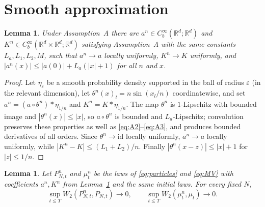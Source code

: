 \documentclass[11pt]{amsart}
\numberwithin{equation}{section}
\theoremstyle{plain}
\newtheorem{lemma}[theorem]{Lemma}
\theoremstyle{remark}
\newcommand{\R}{\mathbb{R}}
\newcommand{\W}{W_2}
\begin{document}
\section{Smooth approximation}\label{sec:approx}

\begin{lemma}\label{lem:mollify}
Under Assumption~A there are $a^n\in C^\infty_b(\R^d;\R^d)$ and $K^n\in C^\infty_b(\R^d\times\R^d;\R^d)$ satisfying Assumption~A with the same constants $L_a,L_1,L_2,M$, such that $a^n\to a$ locally uniformly, $K^n\to K$ uniformly, and $|a^n(x)|\le|a(0)|+L_a(|x|+1)$ for all $n$ and $x$.
\end{lemma}

\begin{proof}
Let $\eta_\varepsilon$ be a smooth probability density supported in the ball of radius $\varepsilon$ (in the relevant dimension), let $\theta^n(x)_l=n\sin(x_l/n)$ coordinatewise, and set $a^n=(a\circ\theta^n)*\eta_{1/n}$ and $K^n=K*\eta_{1/n}$. The map $\theta^n$ is $1$-Lipschitz with bounded image and $|\theta^n(x)|\le|x|$, so $a\circ\theta^n$ is bounded and $L_a$-Lipschitz; convolution preserves these properties as well as \eqref{eq:A2}--\eqref{eq:A3}, and produces bounded derivatives of all orders. Since $\theta^n\to\mathrm{id}$ locally uniformly, $a^n\to a$ locally uniformly, while $|K^n-K|\le(L_1+L_2)/n$. Finally $|\theta^n(x-z)|\le|x|+1$ for $|z|\le1/n$.
\end{proof}

\begin{lemma}\label{lem:stability}
Let $P^n_{N,t}$ and $\mu^n_t$ be the laws of \eqref{eq:particles} and \eqref{eq:MV} with coefficients $a^n,K^n$ from Lemma~\ref{lem:mollify} and the same initial laws. For every fixed $N$,
\[
\sup_{t\le T}\W(P^n_{N,t},P_{N,t})\to0,\qquad \sup_{t\le T}\W(\mu^n_t,\mu_t)\to0.
\]
\end{lemma}
\end{document}
